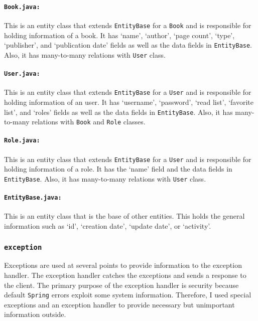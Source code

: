 \paragraph{\texttt{Book.java:}} This is an entity class that extends \texttt{EntityBase} for a \texttt{Book} and is responsible for holding information of a book. It has `name', `author', `page count', `type', `publisher', and `publication date' fields as well as the data fields in \texttt{EntityBase}. Also, it has many-to-many relations with \texttt{User} class. 

\paragraph{\texttt{User.java:}} This is an entity class that extends \texttt{EntityBase} for a \texttt{User} and is responsible for holding information of an user. It has `username', `password', `read list', `favorite list', and `roles' fields as well as the data fields in \texttt{EntityBase}. Also, it has many-to-many relations with \texttt{Book} and \texttt{Role} classes. 

\paragraph{\texttt{Role.java:}} This is an entity class that extends \texttt{EntityBase} for a \texttt{User} and is responsible for holding information of a role. It has the `name' field and the data fields in \texttt{EntityBase}. Also, it has many-to-many relations with \texttt{User} class. 

\paragraph{\texttt{EntityBase.java:}} This is an entity class that is the base of other entities. This holds the general information such as `id', `creation date', `update date', or `activity'.


\subsubsection{\texttt{exception}}

Exceptions are used at several points to provide information to the exception handler. The exception handler catches the exceptions and sends a response to the client. The primary purpose of the exception handler is security because default \texttt{Spring} errors exploit some system information. Therefore, I used special exceptions and an exception handler to provide necessary but unimportant information outside.

